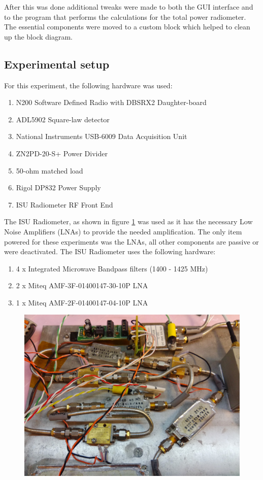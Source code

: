 After this was done additional tweaks were made to both the GUI interface and to the program that performs the calculations for the total power radiometer.  The essential components were moved to a custom block which helped to clean up the block diagram.  

\subsection{Experimental setup} \label{exp1_setup}
For this experiment, the following hardware was used:

\begin{enumerate}
\item N200 Software Defined Radio with DBSRX2 Daughter-board
\item ADL5902 Square-law detector
\item National Instruments USB-6009 Data Acquisition Unit
\item ZN2PD-20-S+ Power Divider
\item 50-ohm matched load
\item Rigol DP832 Power Supply
\item ISU Radiometer RF Front End
\end{enumerate}

The ISU Radiometer, as shown in figure \ref{ISURF} was used as it has the necessary Low Noise Amplifiers (LNAs) to provide the needed amplification.  The only item powered for these experiments was the LNAs, all other components are passive or were deactivated.  The ISU Radiometer uses the following hardware:

\begin{enumerate}
\item 4 x Integrated Microwave Bandpass filters (1400 - 1425 MHz)
\item 2 x Miteq AMF-3F-01400147-30-10P LNA
\item 1 x Miteq AMF-2F-01400147-04-10P LNA
\end{enumerate}

{\begin{figure}[h!tb] \centering
\includegraphics[width=\textwidth]{Images/ISU_RF.jpg}
\label{ISURF}
\end{figure}
}

